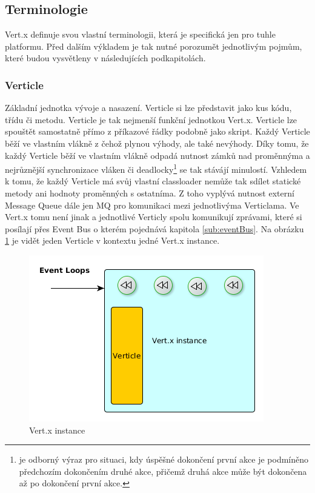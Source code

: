 \subsection{Terminologie}

Vert.x definuje svou vlastní terminologii, která je specifická jen pro tuhle platformu. Před dalším výkladem je tak nutné porozumět jednotlivým pojmům, které budou vysvětleny v následujících podkapitolách.

\subsubsection{Verticle}

Základní jednotka vývoje a nasazení. Verticle si lze představit jako kus kódu, třídu či metodu. Verticle je tak nejmenší funkční jednotkou Vert.x. Verticle lze spouštět samostatně přímo z příkazové řádky podobně jako skript. Každý Verticle běží ve vlastním vlákně z čehož plynou výhody, ale také nevýhody. Díky tomu, že každý Verticle běží ve vlastním vlákně odpadá nutnost zámků nad proměnnýma a nejrůznější synchronizace vláken či deadlocky\footnote{je odborný výraz pro situaci, kdy úspěšné dokončení první akce je podmíněno předchozím dokončením druhé akce, přičemž druhá akce může být dokončena až po dokončení první akce.} se tak stávájí minulostí. Vzhledem k tomu, že každý Verticle má svůj vlastní classloader nemůže tak sdílet statické metody ani hodnoty proměnných s ostatníma. Z toho vyplývá nutnost externí Message Queue\cite{mq} dále jen MQ pro komunikaci mezi jednotlivýma Verticlama. Ve Vert.x tomu není jinak a jednotlivé Verticly spolu komunikují zprávami, které si posílají přes Event Bus o kterém pojednává kapitola \ref{sub:eventBus}. Na obrázku \ref{fig:instance} je vidět jeden Verticle v kontextu jedné Vert.x instance.

\begin{figure}
\begin{centering}
\includegraphics[scale=0.5]{obrazky/instance}
\par\end{centering}
\caption{Vert.x instance \label{fig:instance}}
\end{figure}

